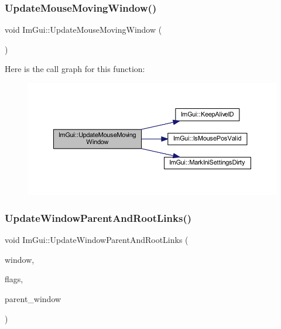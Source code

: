 \subsubsection{\texorpdfstring{Update\+Mouse\+Moving\+Window()}{UpdateMouseMovingWindow()}}
{\footnotesize\ttfamily void Im\+Gui\+::\+Update\+Mouse\+Moving\+Window (\begin{DoxyParamCaption}{ }\end{DoxyParamCaption})}

Here is the call graph for this function\+:
\nopagebreak
\begin{figure}[H]
\begin{center}
\leavevmode
\includegraphics[width=350pt]{namespace_im_gui_a67808962a8f76d51e7dfc701729f1591_cgraph}
\end{center}
\end{figure}
\mbox{\label{namespace_im_gui_a85d7262320ed7ce8e40863b99f8db4a3}} 
\subsubsection{\texorpdfstring{Update\+Window\+Parent\+And\+Root\+Links()}{UpdateWindowParentAndRootLinks()}}
{\footnotesize\ttfamily void Im\+Gui\+::\+Update\+Window\+Parent\+And\+Root\+Links (\begin{DoxyParamCaption}\item[{\mbox{\hyperlink{struct_im_gui_window}{Im\+Gui\+Window}} $\ast$}]{window,  }\item[{\mbox{\hyperlink{imgui_8h_a0b8e067ab4f7a818828c8d89e531addc}{Im\+Gui\+Window\+Flags}}}]{flags,  }\item[{\mbox{\hyperlink{struct_im_gui_window}{Im\+Gui\+Window}} $\ast$}]{parent\+\_\+window }\end{DoxyParamCaption})}

